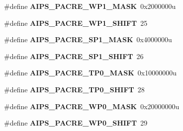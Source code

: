 \begin{DoxyCompactItemize}
\item 
\hypertarget{group___a_i_p_s___register___masks_gafd29af374483ffc1b35e5d02d5f3c1e7}{}\#define {\bfseries A\+I\+P\+S\+\_\+\+P\+A\+C\+R\+E\+\_\+\+W\+P1\+\_\+\+M\+A\+S\+K}~0x2000000u\label{group___a_i_p_s___register___masks_gafd29af374483ffc1b35e5d02d5f3c1e7}

\item 
\hypertarget{group___a_i_p_s___register___masks_ga2fc12a1dae4d9c77bb99592f5d7c86ba}{}\#define {\bfseries A\+I\+P\+S\+\_\+\+P\+A\+C\+R\+E\+\_\+\+W\+P1\+\_\+\+S\+H\+I\+F\+T}~25\label{group___a_i_p_s___register___masks_ga2fc12a1dae4d9c77bb99592f5d7c86ba}

\item 
\hypertarget{group___a_i_p_s___register___masks_gaade2c1c796d31fe32ec0e9e67ad8ce0c}{}\#define {\bfseries A\+I\+P\+S\+\_\+\+P\+A\+C\+R\+E\+\_\+\+S\+P1\+\_\+\+M\+A\+S\+K}~0x4000000u\label{group___a_i_p_s___register___masks_gaade2c1c796d31fe32ec0e9e67ad8ce0c}

\item 
\hypertarget{group___a_i_p_s___register___masks_ga1c62c1e50eb4b5cd08154d227806abdd}{}\#define {\bfseries A\+I\+P\+S\+\_\+\+P\+A\+C\+R\+E\+\_\+\+S\+P1\+\_\+\+S\+H\+I\+F\+T}~26\label{group___a_i_p_s___register___masks_ga1c62c1e50eb4b5cd08154d227806abdd}

\item 
\hypertarget{group___a_i_p_s___register___masks_gaaa3f95d1ad0c085fc78cec9950b0e4b3}{}\#define {\bfseries A\+I\+P\+S\+\_\+\+P\+A\+C\+R\+E\+\_\+\+T\+P0\+\_\+\+M\+A\+S\+K}~0x10000000u\label{group___a_i_p_s___register___masks_gaaa3f95d1ad0c085fc78cec9950b0e4b3}

\item 
\hypertarget{group___a_i_p_s___register___masks_ga33e43ff102c16587af4a1b319ba31787}{}\#define {\bfseries A\+I\+P\+S\+\_\+\+P\+A\+C\+R\+E\+\_\+\+T\+P0\+\_\+\+S\+H\+I\+F\+T}~28\label{group___a_i_p_s___register___masks_ga33e43ff102c16587af4a1b319ba31787}

\item 
\hypertarget{group___a_i_p_s___register___masks_ga748d7f597abbdc063d8d089bfac5264b}{}\#define {\bfseries A\+I\+P\+S\+\_\+\+P\+A\+C\+R\+E\+\_\+\+W\+P0\+\_\+\+M\+A\+S\+K}~0x20000000u\label{group___a_i_p_s___register___masks_ga748d7f597abbdc063d8d089bfac5264b}

\item 
\hypertarget{group___a_i_p_s___register___masks_gadbb6183241cf5602dd8e8cd87f5e970d}{}\#define {\bfseries A\+I\+P\+S\+\_\+\+P\+A\+C\+R\+E\+\_\+\+W\+P0\+\_\+\+S\+H\+I\+F\+T}~29\label{group___a_i_p_s___register___masks_gadbb6183241cf5602dd8e8cd87f5e970d}


\end{DoxyCompactItemize}
